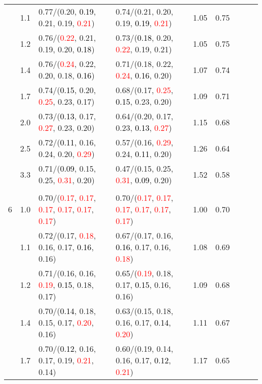 \documentclass[10pt,a4paper]{report}
\begin{document}
\begin{table}[!htbp]
\begin{center}
{\begin{tabular}{ccllccccc}
			&1.1&0.77/(0.20, \textcolor{black}{0.19}, 0.21, 0.19, \textcolor{red}{0.21})&0.74/(0.21, 0.20, 0.19, \textcolor{black}{0.19}, \textcolor{red}{0.21})&1.05&0.75\\
			&1.2&0.76/(\textcolor{red}{0.22}, 0.21, 0.19, 0.20, \textcolor{black}{0.18})&0.73/(\textcolor{black}{0.18}, 0.20, \textcolor{red}{0.22}, 0.19, 0.21)&1.05&0.75\\
			&1.4&0.76/(\textcolor{red}{0.24}, 0.22, 0.20, 0.18, \textcolor{black}{0.16})&0.71/(0.18, 0.22, \textcolor{red}{0.24}, \textcolor{black}{0.16}, 0.20)&1.07&0.74\\
			&1.7&0.74/(\textcolor{black}{0.15}, 0.20, \textcolor{red}{0.25}, 0.23, 0.17)&0.68/(0.17, \textcolor{red}{0.25}, \textcolor{black}{0.15}, 0.23, 0.20)&1.09&0.71\\
			&2.0&0.73/(\textcolor{black}{0.13}, 0.17, \textcolor{red}{0.27}, 0.23, 0.20)&0.64/(0.20, 0.17, 0.23, \textcolor{black}{0.13}, \textcolor{red}{0.27})&1.15&0.68\\
			&2.5&0.72/(\textcolor{black}{0.11}, 0.16, 0.24, 0.20, \textcolor{red}{0.29})&0.57/(0.16, \textcolor{red}{0.29}, 0.24, \textcolor{black}{0.11}, 0.20)&1.26&0.64\\
			&3.3&0.71/(\textcolor{black}{0.09}, 0.15, 0.25, \textcolor{red}{0.31}, 0.20)&0.47/(0.15, 0.25, \textcolor{red}{0.31}, \textcolor{black}{0.09}, 0.20)&1.52&0.58\\
			&&&&\\
			6			&1.0&0.70/(\textcolor{red}{0.17}, \textcolor{red}{0.17}, \textcolor{red}{0.17}, \textcolor{red}{0.17}, \textcolor{red}{0.17}, \textcolor{red}{0.17})&0.70/(\textcolor{red}{0.17}, \textcolor{red}{0.17}, \textcolor{red}{0.17}, \textcolor{red}{0.17}, \textcolor{red}{0.17}, \textcolor{red}{0.17})&1.00&0.70\\
			&1.1&0.72/(0.17, \textcolor{red}{0.18}, 0.16, 0.17, \textcolor{black}{0.16}, 0.16)&0.67/(0.17, 0.16, \textcolor{black}{0.16}, 0.17, 0.16, \textcolor{red}{0.18})&1.08&0.69\\
			&1.2&0.71/(0.16, 0.16, \textcolor{red}{0.19}, \textcolor{black}{0.15}, 0.18, 0.17)&0.65/(\textcolor{red}{0.19}, 0.18, 0.17, \textcolor{black}{0.15}, 0.16, 0.16)&1.09&0.68\\
			&1.4&0.70/(\textcolor{black}{0.14}, 0.18, 0.15, 0.17, \textcolor{red}{0.20}, 0.16)&0.63/(0.15, 0.18, 0.16, 0.17, \textcolor{black}{0.14}, \textcolor{red}{0.20})&1.11&0.67\\
			&1.7&0.70/(\textcolor{black}{0.12}, 0.16, 0.17, 0.19, \textcolor{red}{0.21}, 0.14)&0.60/(0.19, 0.14, 0.16, 0.17, \textcolor{black}{0.12}, \textcolor{red}{0.21})&1.17&0.65\\

\end{tabular}}
\end{center}
\end{table}
\end{document}
